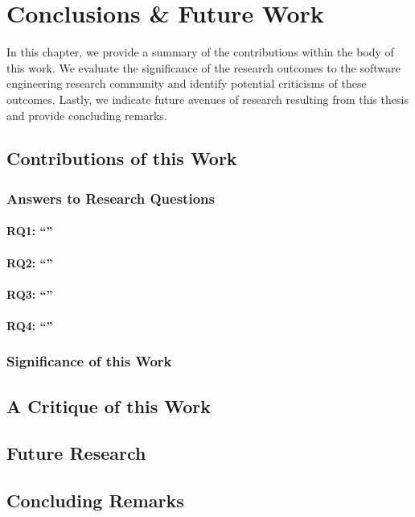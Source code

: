 \chapter{Conclusions \& Future Work}
\label{ch:conclusions}

In this chapter, we provide a summary of the contributions within the body of this work. We evaluate the significance of the research outcomes to the software engineering research community and identify potential criticisms of these outcomes. Lastly, we indicate future avenues of research resulting from this thesis and provide concluding remarks.

\section{Contributions of this Work}

\subsection{Answers to Research Questions}

\subsubsection[Answering RQ1]{RQ1: ``\RQOneTextLandscapeAnalysis{}''}

\subsubsection[Answering RQ2]{RQ2: ``\RQTwoTextDocumentation{}''}

\subsubsection[Answering RQ3]{RQ3: ``\RQThreeTextDevMiscomprehension{}''}

\subsubsection[Answering RQ4]{RQ4: ``\RQFourDesign{}''}

\subsection{Significance of this Work}

\section{A Critique of this Work}

\section{Future Research}

\section{Concluding Remarks}


